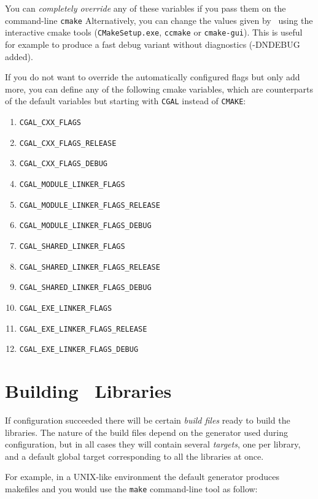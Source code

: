 You can {\em completely override} any of these variables if you pass them on the command-line \texttt{cmake}
Alternatively, you can change the values given by \cmake\ using the
interactive cmake tools (\texttt{CMakeSetup.exe}, \texttt{ccmake} or \texttt{cmake-gui}).  This is useful for example to produce a fast debug
variant without diagnostics (-DNDEBUG added). 

If you do not want to override the automatically configured flags but only add more, you can 
define any of the following cmake variables, which are counterparts of the default
variables but starting with \texttt{CGAL} instead of \texttt{CMAKE}:

\begin{enumerate}
\item \texttt{CGAL\_CXX\_FLAGS}
\item \texttt{CGAL\_CXX\_FLAGS\_RELEASE}
\item \texttt{CGAL\_CXX\_FLAGS\_DEBUG}
\item \texttt{CGAL\_MODULE\_LINKER\_FLAGS}
\item \texttt{CGAL\_MODULE\_LINKER\_FLAGS\_RELEASE}
\item \texttt{CGAL\_MODULE\_LINKER\_FLAGS\_DEBUG}
\item \texttt{CGAL\_SHARED\_LINKER\_FLAGS}
\item \texttt{CGAL\_SHARED\_LINKER\_FLAGS\_RELEASE}
\item \texttt{CGAL\_SHARED\_LINKER\_FLAGS\_DEBUG}
\item \texttt{CGAL\_EXE\_LINKER\_FLAGS}
\item \texttt{CGAL\_EXE\_LINKER\_FLAGS\_RELEASE}
\item \texttt{CGAL\_EXE\_LINKER\_FLAGS\_DEBUG}
\end{enumerate}


\section{Building \cgal\ Libraries}

If configuration succeeded there will be certain {\em build files} ready to build the libraries.
The nature of the build files depend on the generator used during configuration, but in all cases they 
will contain several {\em targets}, one per library,  and a default global target corresponding 
to all the libraries at once.

For example, in a UNIX-like environment the default generator produces makefiles and you would
use the \texttt{make} command-line tool as follow:

